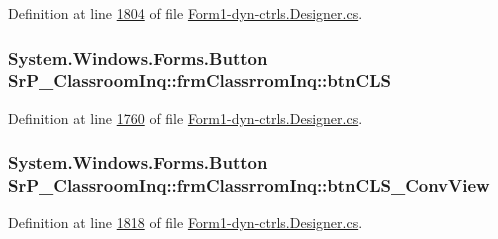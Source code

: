 \-Definition at line \hyperlink{_form1-dyn-ctrls_8_designer_8cs_source_l01804}{1804} of file \hyperlink{_form1-dyn-ctrls_8_designer_8cs_source}{\-Form1-\/dyn-\/ctrls.\-Designer.\-cs}.

\hypertarget{class_sr_p___classroom_inq_1_1frm_classrrom_inq_a750ba6df4c36e55bb0b4211c0915d63c}{
\subsubsection[{btn\-C\-L\-S}]{\setlength{\rightskip}{0pt plus 5cm}\-System.\-Windows.\-Forms.\-Button {\bf \-Sr\-P\-\_\-\-Classroom\-Inq\-::frm\-Classrrom\-Inq\-::btn\-C\-L\-S}}}
\label{class_sr_p___classroom_inq_1_1frm_classrrom_inq_a750ba6df4c36e55bb0b4211c0915d63c}


\-Definition at line \hyperlink{_form1-dyn-ctrls_8_designer_8cs_source_l01760}{1760} of file \hyperlink{_form1-dyn-ctrls_8_designer_8cs_source}{\-Form1-\/dyn-\/ctrls.\-Designer.\-cs}.

\hypertarget{class_sr_p___classroom_inq_1_1frm_classrrom_inq_a2e74908e00f7502b511e8726d1574d7e}{
\subsubsection[{btn\-C\-L\-S\-\_\-\-Conv\-View}]{\setlength{\rightskip}{0pt plus 5cm}\-System.\-Windows.\-Forms.\-Button {\bf \-Sr\-P\-\_\-\-Classroom\-Inq\-::frm\-Classrrom\-Inq\-::btn\-C\-L\-S\-\_\-\-Conv\-View}}}
\label{class_sr_p___classroom_inq_1_1frm_classrrom_inq_a2e74908e00f7502b511e8726d1574d7e}


\-Definition at line \hyperlink{_form1-dyn-ctrls_8_designer_8cs_source_l01818}{1818} of file \hyperlink{_form1-dyn-ctrls_8_designer_8cs_source}{\-Form1-\/dyn-\/ctrls.\-Designer.\-cs}.

